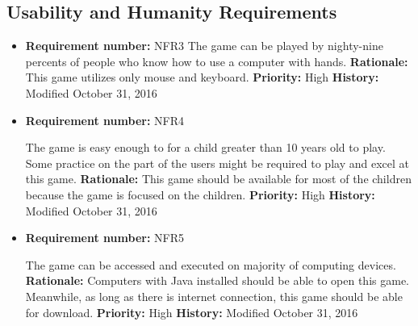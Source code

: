 \documentclass[12pt,letterpaper]{article}
\begin{document}
\subsection{Usability and Humanity Requirements}
\begin{reqbox}
	\begin{itemize}
	\subsubsection{Ease of Use Requirements}	
	\item \textbf{Requirement number: }NFR3
	   	The game can be played by nighty-nine percents of people who know  how to use a computer with hands.
		\textbf{Rationale: } This game utilizes only mouse and keyboard.
		\textbf{Priority: }High
		\textbf{History: }Modified October 31, 2016
	\end{itemize}
\end{reqbox}
\begin{reqbox}
	\begin{itemize}
 	
 	\item \textbf{Requirement number: }NFR4
 	
   	The game is easy enough to for a child greater than 10 years old to play. Some practice on the part of the users might be required to play and excel at this game.
		\textbf{Rationale: } This game should be available for most of the children because the game is focused on the children.
		\textbf{Priority: }High
		\textbf{History: }Modified October 31, 2016
	\end{itemize}
\end{reqbox}
\begin{reqbox}
	\begin{itemize}
 	\subsubsection{Accessibility Requirements}
 	
 	\item \textbf{Requirement number: }NFR5
 	
	The game can be accessed and executed on majority of computing devices. 
		\textbf{Rationale: } Computers with Java installed should be able to open this game. Meanwhile, as long as there is internet connection, this game should be able for download.
		\textbf{Priority: }High
		\textbf{History: }Modified October 31, 2016
	
	\end{itemize}
\end{reqbox}
\end{document}
